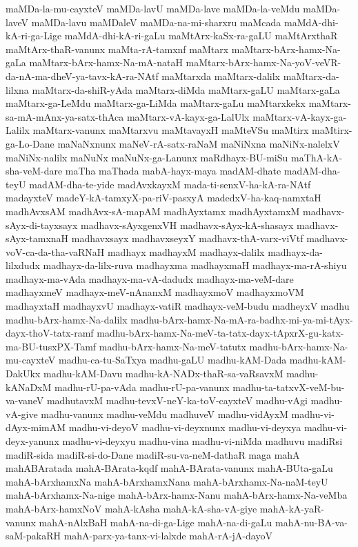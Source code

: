 {maMDa-la-mu-cayxteV
maMDa-lavU
maMDa-lave
maMDa-la-veMdu
maMDa-laveV
maMDa-lavu
maMDaleV
maMDa-na-mi-sharxru
maMcada
maMdA-dhi-kA-ri-ga-Lige
maMdA-dhi-kA-ri-gaLu
maMtArx-kaSx-ra-gaLU
maMtArxthaR
maMtArx-thaR-vanunx
maMta-rA-tamxnf
maMtarx
maMtarx-bArx-hamx-Na-gaLa
maMtarx-bArx-hamx-Na-mA-nataH
maMtarx-bArx-hamx-Na-yoV-veVR-da-nA-ma-dheV-ya-tavx-kA-ra-NAtf
maMtarxda
maMtarx-dalilx
maMtarx-da-lilxna
maMtarx-da-shiR-yAda
maMtarx-diMda
maMtarx-gaLU
maMtarx-gaLa
maMtarx-ga-LeMdu
maMtarx-ga-LiMda
maMtarx-gaLu
maMtarxkekx
maMtarx-sa-mA-mAnx-ya-satx-thAca
maMtarx-vA-kayx-ga-LalUlx
maMtarx-vA-kayx-ga-Lalilx
maMtarx-vanunx
maMtarxvu
maMtavayxH
maMteVSu
maMtirx
maMtirx-ga-Lo-Dane
maNaNxnunx
maNeV-rA-satx-raNaM
maNiNxna
maNiNx-nalelxV
maNiNx-nalilx
maNuNx
maNuNx-ga-Lanunx
maRdhayx-BU-miSu
maThA-kA-sha-veM-dare
maTha
maThada
mabA-hayx-maya
madAM-dhate
madAM-dha-teyU
madAM-dha-te-yide
madAvxkayxM
mada-ti-senxV-ha-kA-ra-NAtf
madayxteV
madeY-kA-tamxyX-pa-riV-pasxyA
madedxV-ha-kaq-namxtaH
madhAvxsAM
madhAvx-sA-mapAM
madhAyxtamx
madhAyxtamxM
madhavx-sAyx-di-tayxsayx
madhavx-sAyxgenxVH
madhavx-sAyx-kA-shasayx
madhavx-sAyx-tamxnaH
madhavxsayx
madhavxseyxY
madhavx-thA-varx-viVtf
madhavx-voV-ca-da-tha-vaRNaH
madhayx
madhayxM
madhayx-dalilx
madhayx-da-lilxdudx
madhayx-da-lilx-ruva
madhayxma
madhayxmaH
madhayx-ma-rA-shiyu
madhayx-ma-vAda
madhayx-ma-vA-dadudx
madhayx-ma-veM-dare
madhayxmeV
madhayx-meV-nAnanxM
madhayxmoV
madhayxmoVM
madhayxtaH
madhayxvU
madhayx-vatiR
madhayx-veM-budu
madheyxV
madhu
madhu-bArx-hamx-Na-dalilx
madhu-bArx-hamx-Na-mA-ra-badhx-mi-ya-mi-tAyx-dayx-thoV-tatx-ramf
madhu-bArx-hamx-Na-meV-ta-tatx-dayx-tApxrX-gu-katx-ma-BU-tusxPX-Tamf
madhu-bArx-hamx-Na-meV-tatutx
madhu-bArx-hamx-Na-mu-cayxteV
madhu-ca-tu-SaTxya
madhu-gaLU
madhu-kAM-Dada
madhu-kAM-DakUkx
madhu-kAM-Davu
madhu-kA-NADx-thaR-sa-vaRsavxM
madhu-kANaDxM
madhu-rU-pa-vAda
madhu-rU-pa-vanunx
madhu-ta-tatxvX-veM-bu-va-vaneV
madhutavxM
madhu-tevxV-neY-ka-toV-cayxteV
madhu-vAgi
madhu-vA-give
madhu-vanunx
madhu-veMdu
madhuveV
madhu-vidAyxM
madhu-vi-dAyx-mimAM
madhu-vi-deyoV
madhu-vi-deyxnunx
madhu-vi-deyxya
madhu-vi-deyx-yanunx
madhu-vi-deyxyu
madhu-vina
madhu-vi-niMda
madhuvu
madiRsi
madiR-sida
madiR-si-do-Dane
madiR-su-va-neM-dathaR
maga
mahA
mahABAratada
mahA-BArata-kqdf
mahA-BArata-vanunx
mahA-BUta-gaLu
mahA-bArxhamxNa
mahA-bArxhamxNana
mahA-bArxhamx-Na-naM-teyU
mahA-bArxhamx-Na-nige
mahA-bArx-hamx-Nanu
mahA-bArx-hamx-Na-veMba
mahA-bArx-hamxNoV
mahA-kAsha
mahA-kA-sha-vA-giye
mahA-kA-yaR-vanunx
mahA-nAlxBaH
mahA-na-di-ga-Lige
mahA-na-di-gaLu
mahA-nu-BA-va-saM-pakaRH
mahA-parx-ya-tanx-vi-lalxde
mahA-rA-jA-dayoV
}
